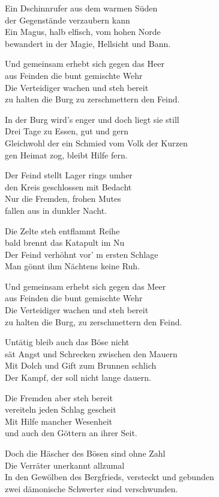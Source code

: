 Ein Dschinnrufer aus dem warmen Süden\\
der Gegenstände verzaubern kann\\
Ein Magus, halb elfisch, vom hohen Norde\\
bewandert in der Magie, Hellsicht und Bann.

Und gemeinsam erhebt sich gegen das Heer\\
aus Feinden die bunt gemischte Wehr\\
Die Verteidiger wachen und steh bereit\\
zu halten die Burg zu zerschmettern den Feind.

In der Burg wird's enger und doch liegt sie still\\
Drei Tage zu Essen, gut und gern\\
Gleichwohl der ein Schmied vom Volk der Kurzen\\
gen Heimat zog, bleibt Hilfe fern.

Der Feind stellt Lager rings umher\\
den Kreis geschlossen mit Bedacht\\
Nur die Fremden, frohen Mutes\\
fallen aus in dunkler Nacht.

Die Zelte steh entflammt Reihe\\
bald brennt das Katapult im Nu\\
Der Feind verhöhnt vor' m ersten Schlage\\
Man gönnt ihm Nächtens keine Ruh.

Und gemeinsam erhebt sich gegen das Meer\\
aus Feinden die bunt gemischte Wehr\\
Die Verteidiger wachen und steh bereit\\
zu halten die Burg, zu zerschmettern den Feind.

Untätig bleib auch das Böse nicht\\
sät Angst und Schrecken zwischen den Mauern\\
Mit Dolch und Gift zum Brunnen schlich\\
Der Kampf, der soll nicht lange dauern.

Die Fremden aber steh bereit\\
vereiteln jeden Schlag gescheit\\
Mit Hilfe mancher Wesenheit\\
und auch den Göttern an ihrer Seit.

Doch die Häscher des Bösen sind ohne Zahl\\
Die Verräter unerkannt allzumal\\
In den Gewölben des Bergfrieds, versteckt und gebunden\\
zwei dämonische Schwerter sind verschwunden.

